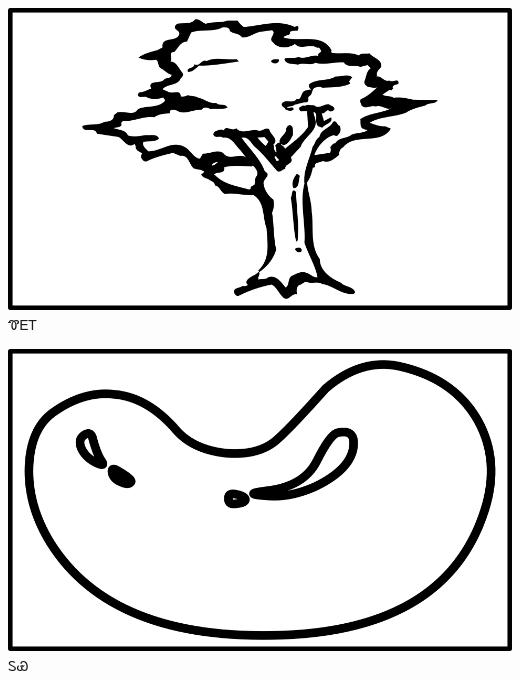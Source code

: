 \documentclass[avery5371]{flashcards}%
\begin{document}
\begin{flashcard}{
\includegraphics[width=0.95\columnwidth,height=.51\columnwidth,keepaspectratio]{../artwork/objects-rod/hlgv}
}
\Huge ᏡᎬᎢ
\end{flashcard}

\begin{flashcard}{
\includegraphics[width=0.95\columnwidth,height=.51\columnwidth,keepaspectratio]{../artwork/objects-neutral/tuya}
}
\Huge ᏚᏯ
\end{flashcard}
\end{document}
